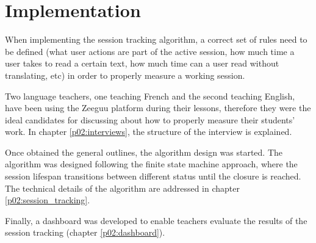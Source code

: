\chapter{Implementation}\label{p02:implementation}
When implementing the session tracking algorithm, a correct set of rules need to be defined (\Eg what user actions are part of the active session, how much time a user takes to read a certain text, how much time can a user read without translating, etc) in order to properly measure a working session.

Two language teachers, one teaching French and the second teaching English, have been using the Zeeguu platform during their lessons, therefore they were the ideal candidates for discussing about how to properly measure their students' work. In chapter \ref{p02:interviews}, the structure of the interview is explained.

Once obtained the general outlines, the algorithm design was started. The algorithm was designed following the finite state machine approach, where the session lifespan transitions between different status until the closure is reached. The technical details of the algorithm are addressed in chapter \ref{p02:session_tracking}.

Finally, a dashboard was developed to enable teachers evaluate the results of the session tracking (chapter \ref{p02:dashboard}).


